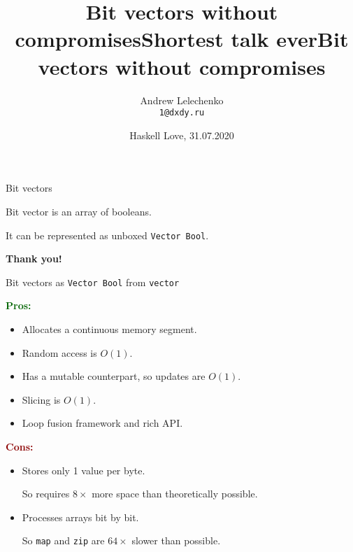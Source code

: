 \documentclass[handout]{beamer}
\title{Bit vectors without compromises}
\author[Andrew Lelechenko]{Andrew Lelechenko \\ \texttt{1@dxdy.ru}}
\institute[Barclays]{Barclays, London}
\date{Haskell Love, 31.07.2020}
\def\pros{\textcolor{darkgreen}{\bf Pros:} }
\def\cons{\textcolor{darkred}{\bf Cons:} }
\begin{document}
\begin{frame}
  \titlepage
\end{frame}

\title{Shortest talk ever}

\begin{frame}{Bit vectors}

Bit vector is an array of booleans.

It can be represented as unboxed {\tt Vector Bool}.

\pause

\bigskip\bigskip\bigskip
\bigskip\bigskip\bigskip

\centerline{\Huge\bf Thank you!}



\end{frame}

\title{Bit vectors without compromises}

\begin{frame}{Bit vectors as {\tt Vector Bool} from {\tt vector}}

\pros

\begin{itemize}
\item Allocates a continuous memory segment.
\item Random access is $O(1)$.
\item Has a mutable counterpart, so updates are $O(1)$.
\item Slicing is $O(1)$.
\item Loop fusion framework and rich API.
\end{itemize}

\pause

\cons

\begin{itemize}
\item Stores only 1 value per byte. \par
      So requires $8\times$ more space than theoretically possible.
\item Processes arrays bit by bit. \par
      So {\tt map} and {\tt zip} are $64\times$ slower than possible.
\end{itemize}

\end{frame}
\end{document}

